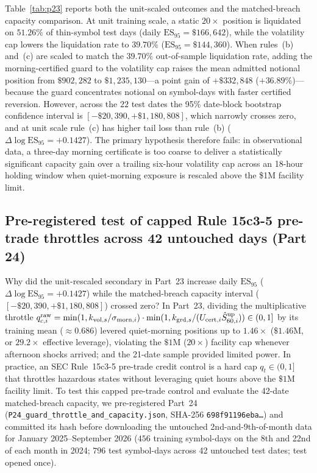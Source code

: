 Table~\ref{tab:p23} reports both the unit-scaled outcomes and the matched-breach capacity comparison. At unit training scale, a static $20\times$ position is liquidated on $51.26\%$ of thin-symbol test days (daily $\mathrm{ES}_{95}=\$166{,}642$), while the volatility cap lowers the liquidation rate to $39.70\%$ ($\mathrm{ES}_{95}=\$144{,}360$). When rules~(b) and~(c) are scaled to match the $39.70\%$ out-of-sample liquidation rate, adding the morning-certified guard to the volatility cap raises the mean admitted notional position from $\$902{,}282$ to $\$1{,}235{,}130$---a point gain of $+\$332{,}848$ ($+36.89\%$)---because the guard concentrates notional on symbol-days with faster certified reversion. However, across the $22$ test dates the 95\% date-block bootstrap confidence interval is $[-\$20{,}390,+\$1{,}180{,}808]$, which narrowly crosses zero, and at unit scale rule~(c) has higher tail loss than rule~(b) ($\Delta\log\mathrm{ES}_{95}=+0.1427$). The primary hypothesis therefore fails: in observational data, a three-day morning certificate is too coarse to deliver a statistically significant capacity gain over a trailing six-hour volatility cap across an 18-hour holding window when quiet-morning exposure is rescaled above the \$1M facility limit.

\subsection{Pre-registered test of capped Rule 15c3-5 pre-trade throttles across 42 untouched days (Part 24)}\label{sec:p24}
Why did the unit-rescaled secondary in Part~23 increase daily $\mathrm{ES}_{95}$ ($\Delta\log\mathrm{ES}_{95}=+0.1427$) while the matched-breach capacity interval ($[-\$20{,}390,+\$1{,}180{,}808]$) crossed zero? In Part~23, dividing the multiplicative throttle $q^{\rm raw}_{c,i}=\min(1,k_{{\rm vol},s}/\sigma_{{\rm morn},i})\cdot\min(1,k_{{\rm grd},s}/(U_{{\rm cert},i}\hat S^{\rm up}_{60,i}))\in(0,1]$ by its training mean ($\approx0.686$) levered quiet-morning positions up to $1.46\times$ ($\$1.46\text{M}$, or $29.2\times$ effective leverage), violating the $\$1\text{M}$ ($20\times$) facility cap whenever afternoon shocks arrived; and the 21-date sample provided limited power. In practice, an SEC Rule~15c3-5 pre-trade credit control is a hard cap $q_t\in(0,1]$ that throttles hazardous states without leveraging quiet hours above the $\$1\text{M}$ facility limit. To test this capped pre-trade control and evaluate the 42-date matched-breach capacity, we pre-registered Part~24 (\texttt{P24\_guard\_throttle\_and\_capacity.json}, SHA-256 \texttt{698f91196eba\ldots}) and committed its hash before downloading the untouched 2nd-and-9th-of-month data for January 2025--September 2026 ($456$ training symbol-days on the 8th and 22nd of each month in 2024; $796$ test symbol-days across 42 untouched test dates; test opened once).

